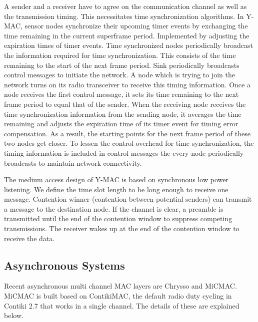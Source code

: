 A sender and a receiver have to agree on the communication channel as well as the transmission timing. This necessitates time synchronization algorithms. In Y-MAC, sensor nodes synchronize their upcoming timer events by exchanging the time remaining in the current superframe period. Implemented by adjusting the expiration times of timer events. Time synchronized nodes periodically broadcast the information required for time synchronization. This consists of the time remaining to the start of the next frame period. Sink periodically broadcasts control messages to initiate the network. A node which is trying to join the network turns on its radio transceiver to receive this timing information. Once a node receives the first control message, it sets its time remaining to the next frame period to equal that of the sender. When the receiving node receives the time synchronization information from the sending node, it averages the time remaining and adjusts the expiration time of its timer event for timing error compensation. As a result, the starting points for the next frame period of these two nodes get closer. To lessen the control overhead for time synchronization, the timing information is included in control messages the every node periodically broadcasts to maintain network connectivity. 

The medium access design of Y-MAC is based on synchronous low power listening. We define the time slot length to be long enough to receive one message. Contention winner (contention between potential senders) can transmit a message to the destination node. If the channel is clear, a preamble is transmitted until the end of the contention window to suppress competing transmissions. The receiver wakes up at the end of the contention window to receive the data. \cite{y-mac}

\subsection{Asynchronous Systems}
Recent asynchronous multi channel MAC layers are Chrysso and MiCMAC. MiCMAC is built based on ContikiMAC, the default radio duty cycling in Contiki 2.7 that works in a single channel. The details of these are explained below.


